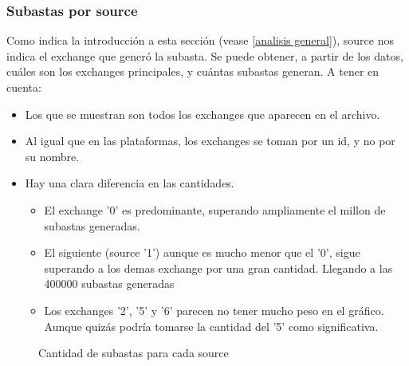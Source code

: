 \documentclass[a4paper, 12pt]{article}
\newcommand\tab[1][1cm]{\hspace*{#1}}
\begin{document}
	\subsubsection{Subastas por source}
	\tab Como indica la introducción a esta sección (vease \ref{analisis general}), source nos indica el exchange que generó la subasta. Se puede obtener, a partir de los datos, cuáles son los exchanges principales, y cuántas subastas generan.
	\tab A tener en cuenta:
	\begin{itemize}
		\item Los que se muestran son todos los exchanges que aparecen en el archivo.
		\item Al igual que en las plataformas, los exchanges se toman por un id, y no por su nombre.
		\item Hay una clara diferencia en las cantidades.
		\begin{itemize}
			\item El exchange '0' es predominante, superando ampliamente el millon de subastas generadas.
			\item El siguiente (source '1') aunque es mucho menor que el '0', sigue superando a los demas exchange por una gran cantidad. Llegando a las 400000 subastas generadas
			\item Los exchanges '2', '5' y '6' parecen no tener mucho peso en el gráfico. Aunque quizás podría tomarse la cantidad del '5' como significativa.
		\end{itemize}
	\end{itemize}

	\FloatBarrier
		\begin{figure}
			\centering
		   	\caption{Cantidad de subastas para cada source}
			\label{subastassource}
		\end{figure}
	\FloatBarrier
\end{document}
